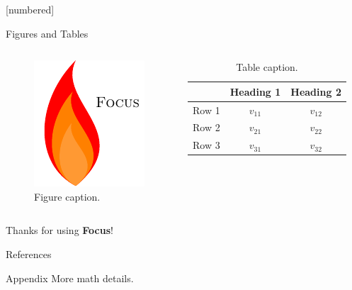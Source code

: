 \documentclass{beamer}
\begin{document}
    
[numbered]
    \begin{frame}{Figures and Tables}
        \begin{columns}
                \begin{figure}
                    \centering
                    \includegraphics{focus-logo.pdf}
                    \caption{Figure caption.}
                    \label{fig:focuslogo}
                \end{figure}
                
                \begin{table}
                    \centering
                    \begin{tabular}{rcc}
                         & Heading 1 & Heading 2 \\\hline
                        Row 1 & \(v_{11}\) & \(v_{12}\) \\
                        Row 2 & \(v_{21}\) & \(v_{22}\) \\
                        Row 3 & \(v_{31}\) & \(v_{32}\) \\
                    \end{tabular}
                    \caption{Table caption.}
                    \label{tab:demo}
                \end{table}
        \end{columns}
    \end{frame}
    
    \begin{frame}[focus]
        Thanks for using \textbf{Focus}!
    \end{frame}
    
    \appendix
    \begin{frame}{References}
        \nocite{*}
        
        
    \end{frame}
    
    \begin{frame}{Appendix}
        More math details.
    \end{frame}
\end{document}
